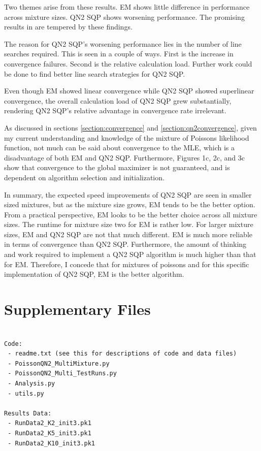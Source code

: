 \documentclass[letter,12pt]{article}
\begin{document}
Two themes arise from these results.  EM shows little difference in performance across mixture sizes.  QN2 SQP shows worsening performance.  The promising results in \cite{jamshidianj97} are tempered by these findings.

The reason for QN2 SQP's worsening performance lies in the number of line searches required.  This is seen in a couple of ways.  First is the increase in convergence failures.  Second is the relative calculation load.  Further work could be done to find better line search strategies for QN2 SQP.

Even though EM showed linear convergence while QN2 SQP showed superlinear convergence, the overall calculation load of QN2 SQP grew substantially, rendering QN2 SQP's relative advantage in convergence rate irrelevant.

As discussed in sections \ref{section:convergence} and \ref{section:qn2convergence}, given my current understanding and knowledge of the mixture of Poissons likelihood function, not much can be said about convergence to the MLE, which is a disadvantage of both EM and QN2 SQP.  Furthermore, Figures 1c, 2c, and 3c show that convergence to the global maximizer is not guaranteed, and is dependent on algorithm selection and initialization.

In summary, the expected speed improvements of QN2 SQP are seen in smaller sized mixtures, but as the mixture size grows, EM tends to be the better option.  From a practical perspective, EM looks to be the better choice across all mixture sizes.  The runtime for mixture size two for EM is rather low.  For larger mixture sizes, EM and QN2 SQP are not that much different.  EM is much more reliable in terms of convergence than QN2 SQP.  Furthermore, the amount of thinking and work required to implement a QN2 SQP algorithm is much higher than that for EM.  Therefore, I concede that for mixtures of poissons and for this specific implementation of QN2 SQP, EM is the better algorithm.

\section{Supplementary Files}
\begin{verbatim}

Code:
 - readme.txt (see this for descriptions of code and data files)
 - PoissonQN2_MultiMixture.py
 - PoissonQN2_Multi_TestRuns.py
 - Analysis.py
 - utils.py

Results Data:
 - RunData2_K2_init3.pk1
 - RunData2_K5_init3.pk1
 - RunData2_K10_init3.pk1
\end{verbatim}

\pagebreak


\end{document}
